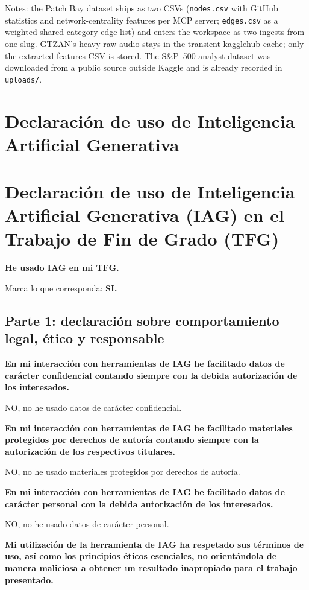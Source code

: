Notes: the Patch Bay dataset ships as two CSVs (\texttt{nodes.csv} with GitHub statistics and network-centrality features per MCP server; \texttt{edges.csv} as a weighted shared-category edge list) and enters the workspace as two ingests from one slug. GTZAN's heavy raw audio stays in the transient kagglehub cache; only the extracted-features CSV is stored. The S\&P~500 analyst dataset was downloaded from a public source outside Kaggle and is already recorded in \texttt{uploads/}.

\clearpage
\section{Declaración de uso de Inteligencia Artificial Generativa}
\label{sec:anx-iag}



\clearpage
\section{Declaración de uso de Inteligencia Artificial Generativa (IAG) en el Trabajo de Fin de Grado (TFG)}
\label{sec:anx-iag}

\textbf{He usado IAG en mi TFG.}

Marca lo que corresponda: \textbf{SI.}

\subsection*{Parte 1: declaración sobre comportamiento legal, ético y responsable}

\textbf{En mi interacción con herramientas de IAG he facilitado datos de carácter confidencial contando siempre con la debida autorización de los interesados.}

NO, no he usado datos de carácter confidencial.

\textbf{En mi interacción con herramientas de IAG he facilitado materiales protegidos por derechos de autoría contando siempre con la autorización de los respectivos titulares.}

NO, no he usado materiales protegidos por derechos de autoría.

\textbf{En mi interacción con herramientas de IAG he facilitado datos de carácter personal con la debida autorización de los interesados.}

NO, no he usado datos de carácter personal.

\textbf{Mi utilización de la herramienta de IAG ha respetado sus términos de uso, así como los principios éticos esenciales, no orientándola de manera maliciosa a obtener un resultado inapropiado para el trabajo presentado.}

